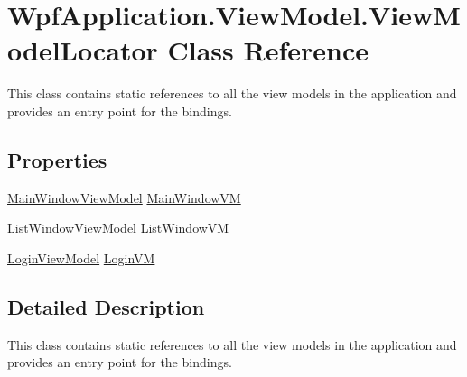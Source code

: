 \hypertarget{class_wpf_application_1_1_view_model_1_1_view_model_locator}{\section{Wpf\-Application.\-View\-Model.\-View\-Model\-Locator Class Reference}
\label{class_wpf_application_1_1_view_model_1_1_view_model_locator}
}


This class contains static references to all the view models in the application and provides an entry point for the bindings.  


\subsection*{Properties}
\begin{DoxyCompactItemize}
\item 
\hyperlink{class_wpf_application_1_1_view_model_1_1_main_window_view_model}{Main\-Window\-View\-Model} \hyperlink{class_wpf_application_1_1_view_model_1_1_view_model_locator_aac247b5370a00abd0926b977184c44b9}{Main\-Window\-V\-M}
\item 
\hyperlink{class_wpf_application_1_1_view_model_1_1_list_window_view_model}{List\-Window\-View\-Model} \hyperlink{class_wpf_application_1_1_view_model_1_1_view_model_locator_aedd4a6f129a75f8a815f010aa630cd14}{List\-Window\-V\-M}
\item 
\hyperlink{class_wpf_application_1_1_view_model_1_1_login_view_model}{Login\-View\-Model} \hyperlink{class_wpf_application_1_1_view_model_1_1_view_model_locator_a8b5745db77599fab266dbbad259e9c34}{Login\-V\-M}
\end{DoxyCompactItemize}


\subsection{Detailed Description}
This class contains static references to all the view models in the application and provides an entry point for the bindings. 



